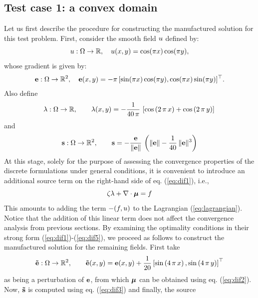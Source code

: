 \subsection{Test case 1: a convex domain}\label{sec:test_case1}

Let us first describe the procedure for constructing the manufactured solution for this test problem. First, consider the smooth field $u$ defined by:
\begin{equation}
	u:\Omega \to \mathbb{R},\quad u(x,y) = \cos(\pi x)\cos(\pi y),
\end{equation}
whose gradient is given by:
\begin{equation*}
	\begin{aligned}
	\mathbf{e}: \Omega \to \mathbb{R}^{2}, \quad \mathbf{e}(x,y) = -\pi \, [\sin(\pi x)\cos(\pi y), \cos(\pi x)\sin(\pi y)]^{\top}. \\
	\end{aligned}
\end{equation*}
Also define 
$$
\lambda: \Omega \rightarrow \mathbb{R},\qquad \lambda(x,y) = -\frac{1}{40\,\pi}\,\left[\cos\left(2\,\pi\,x \right) + \cos\left(2\,\pi\,y \right)\right] \\ \\
$$
and
\begin{equation}
\mathbf{s}:\Omega \rightarrow \mathbb{R}^2, \qquad \mathbf{s} = -\dfrac{\mathbf{e}}{\|\mathbf{e}\|}\, \left(\|\mathbf{e}\| - \dfrac{1}{40}\,\|\mathbf{e}\|^{3}\right) \label{eq:constlaw}
\end{equation}
At this stage, solely for the purpose of assessing the convergence properties of the discrete formulations under general conditions, it is convenient to introduce an additional source term on the right-hand side of eq. (\ref{eq:dif1}), i.e.,
\begin{equation}
	\zeta \lambda  + \nabla \cdot \boldsymbol{\mu}  =  f
\end{equation}
This amounts to adding the term $-({f , u})$ to the Lagrangian (\ref{eq:lagrangian}).
Notice that the addition of this linear term does not affect the convergence analysis from previous sections.
By examining the optimality conditions in their strong form (\ref{eq:dif1})-(\ref{eq:dif5}),
we proceed as follows to construct the manufactured solution for the remaining fields.
First take
$$
\mathbf{\tilde{e}}:\Omega \rightarrow \mathbb{R}^2, \qquad \mathbf{\tilde{e}}(x,y) = \mathbf{e}(x,y) + \frac{1}{20} \left[\sin\left(4\,\pi\,x \right), \sin\left(4\,\pi\,y\right) \right]^{\top}
$$
as being a perturbation of $\mathbf{e}$, from which $\boldsymbol{\mu}$ can be obtained using eq. (\ref{eq:dif2}).
Now, $\mathbf{\tilde{s}}$ is computed using eq. (\ref{eq:dif3}) and finally, the source 
